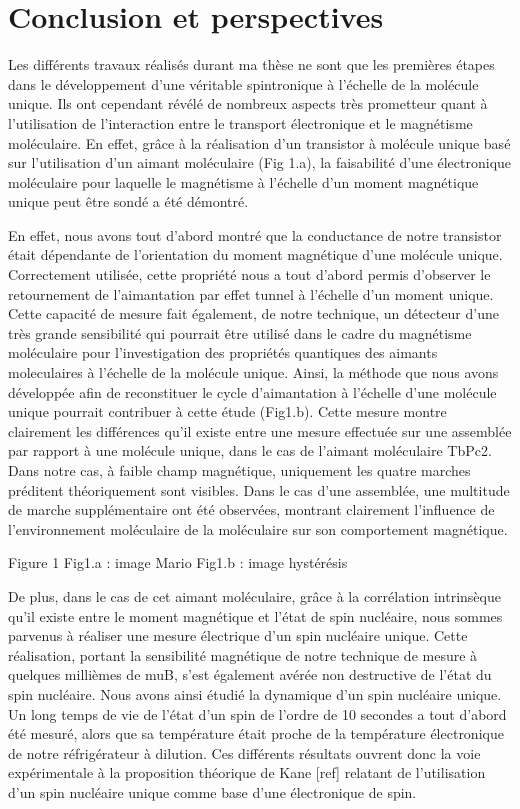 \chapter*{Conclusion et perspectives}
\setcounter{figure}{0}

Les différents travaux réalisés durant ma thèse ne sont que les premières étapes dans le développement d'une véritable spintronique à l'échelle de la molécule unique. Ils ont cependant révélé de nombreux aspects très prometteur quant à l'utilisation de l'interaction entre le transport électronique et le magnétisme moléculaire. En effet, grâce à la réalisation d'un transistor à molécule unique basé sur l'utilisation d'un aimant moléculaire (Fig 1.a), la faisabilité d'une électronique moléculaire pour laquelle le magnétisme à l'échelle d'un moment magnétique unique peut être sondé a été démontré. 

En effet, nous avons tout d'abord montré que la conductance de notre transistor était dépendante de l'orientation du moment magnétique d'une molécule unique. Correctement utilisée, cette propriété nous a tout d'abord permis d'observer le retournement de l'aimantation par effet tunnel à l'échelle d'un moment unique. Cette capacité de mesure fait également, de notre technique, un détecteur d'une très grande sensibilité qui pourrait être utilisé dans le cadre du magnétisme moléculaire pour l'investigation des propriétés quantiques des aimants moleculaires à l'échelle de la molécule unique. Ainsi, la méthode que nous avons développée afin de reconstituer le cycle d'aimantation à l'échelle d'une molécule unique pourrait contribuer à cette étude (Fig1.b). Cette mesure montre clairement les différences qu'il existe entre une mesure effectuée sur une assemblée par rapport à une molécule unique, dans le cas de l'aimant moléculaire TbPc2. Dans notre cas, à faible champ magnétique, uniquement les quatre marches préditent théoriquement sont visibles. Dans le cas d'une assemblée, une multitude de marche supplémentaire ont été observées, montrant clairement l'influence de l'environnement moléculaire de la moléculaire sur son comportement magnétique.

Figure 1
Fig1.a : image Mario
Fig1.b : image hystérésis

De plus, dans le cas de cet aimant moléculaire, grâce à la corrélation intrinsèque qu'il existe entre le moment magnétique et l'état de spin nucléaire, nous sommes parvenus à réaliser une mesure électrique d'un spin nucléaire unique. Cette réalisation, portant la sensibilité magnétique de notre technique de mesure à quelques millièmes de muB, s'est également avérée non destructive de l'état du spin nucléaire. Nous avons ainsi étudié la dynamique d'un spin nucléaire unique. Un long temps de vie de l'état d'un spin de l'ordre de 10 secondes a tout d'abord été mesuré, alors que sa température était proche de la température électronique de notre réfrigérateur à dilution. Ces différents résultats ouvrent donc la voie expérimentale à la proposition théorique de Kane [ref] relatant de l'utilisation d'un spin nucléaire unique comme base d'une électronique de spin.


